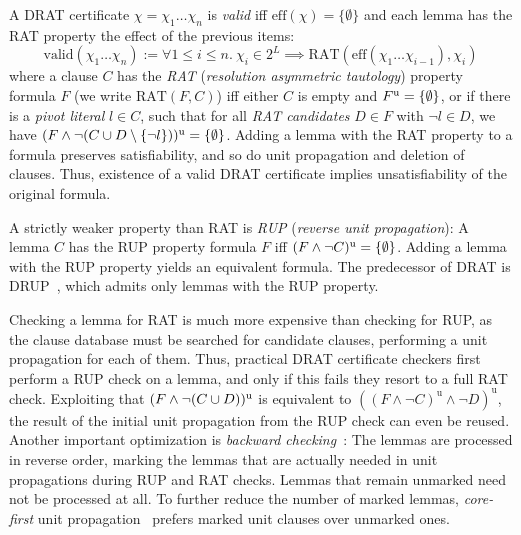 \documentclass[smallcondensed]{svjour3}     %
\begin{document}
A DRAT certificate $\chi = \chi_1\ldots\chi_n$ is \emph{valid} iff $\textrm{eff}(\chi) = \{\emptyset\}$ and each lemma has the RAT property \wrt the effect of the previous items:
\[
  \textrm{valid}(\chi_1 \ldots \chi_n) := \forall 1\le i\le n.~\chi_i\in2^L \implies\textrm{RAT}( \textrm{eff}(\chi_1\ldots \chi_{i-1}), \chi_i )
\]
where a clause $C$ has the \emph{RAT} (\emph{resolution asymmetric tautology}) property \wrt formula $F$ (we write $\textrm{RAT}(F,C)$) iff either $C$ is empty and $F^{\textrm u}=\{\emptyset\}$,
or if there is a \emph{pivot literal} $l\in C$, such that for all \emph{RAT candidates} $D\in F$ with $\neg l \in D$, we have $(F \wedge \neg(C \cup D\setminus\{\neg l\}))^{\textrm u} = \{\emptyset\}$.
Adding a lemma with the RAT property to a formula preserves satisfiability, and so do unit propagation and deletion of clauses. Thus, existence of a valid DRAT certificate implies unsatisfiability of the original formula.


A strictly weaker property than RAT is \emph{RUP} (\emph{reverse unit propagation}): A lemma $C$ has the RUP property \wrt formula $F$ iff $(F \wedge \neg C)^{\textrm u} = \{\emptyset\}$.
Adding a lemma with the RUP property yields an equivalent formula. The predecessor of DRAT is DRUP~\cite{HHW13}, which admits only lemmas with the RUP property.

Checking a lemma for RAT is much more expensive than checking for RUP, as the clause database must be searched for candidate clauses,
performing a unit propagation for each of them. Thus, practical DRAT certificate checkers first perform a RUP check on a lemma, and only if 
this fails they resort to a full RAT check. Exploiting that $(F\wedge\neg(C\cup D))^\textrm{u}$ is equivalent to $((F \wedge \neg C)^\textrm{u} \wedge \neg D)^\textrm{u}$,
the result of the initial unit propagation from the RUP check can even be reused.
Another important optimization is \emph{backward checking}~\cite{GoNo03,HHW13}: The lemmas are processed in reverse order, marking the lemmas that are actually needed 
in unit propagations during RUP and RAT checks. Lemmas that remain unmarked need not be processed at all. To further reduce the number of marked lemmas, 
\emph{core-first} unit propagation~\cite{WHH14} prefers marked unit clauses over unmarked ones.
\end{document}
